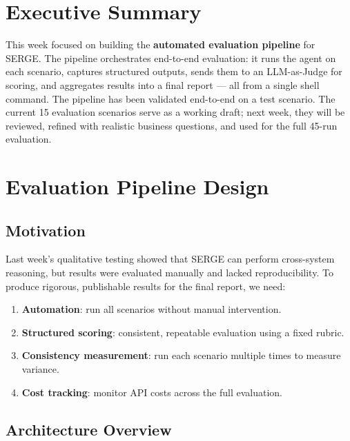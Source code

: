 \documentclass[11pt,a4paper]{article}
\begin{document}
\section{Executive Summary}

This week focused on building the \textbf{automated evaluation pipeline} for SERGE. The pipeline orchestrates end-to-end evaluation: it runs the agent on each scenario, captures structured outputs, sends them to an LLM-as-Judge for scoring, and aggregates results into a final report --- all from a single shell command. The pipeline has been validated end-to-end on a test scenario. The current 15 evaluation scenarios serve as a working draft; next week, they will be reviewed, refined with realistic business questions, and used for the full 45-run evaluation.

\section{Evaluation Pipeline Design}

\subsection{Motivation}

Last week's qualitative testing showed that SERGE can perform cross-system reasoning, but results were evaluated manually and lacked reproducibility. To produce rigorous, publishable results for the final report, we need:

\begin{enumerate}[itemsep=0.3em]
    \item \textbf{Automation}: run all scenarios without manual intervention.
    \item \textbf{Structured scoring}: consistent, repeatable evaluation using a fixed rubric.
    \item \textbf{Consistency measurement}: run each scenario multiple times to measure variance.
    \item \textbf{Cost tracking}: monitor API costs across the full evaluation.
\end{enumerate}

\subsection{Architecture Overview}
\end{document}
